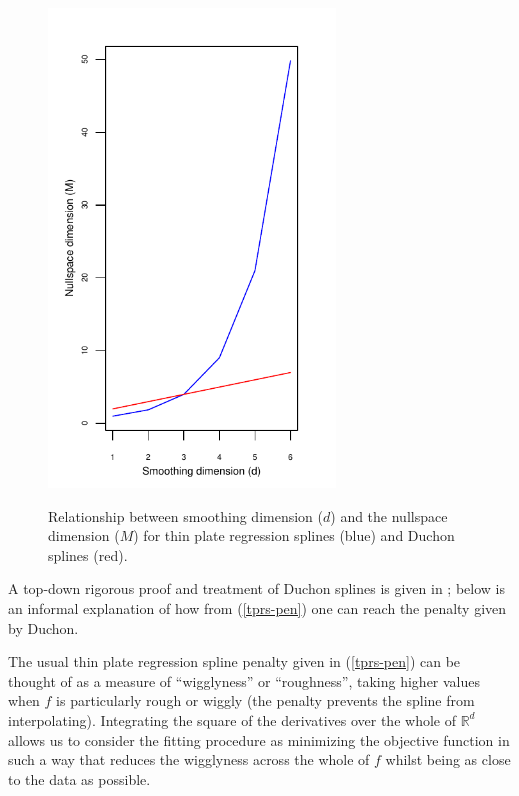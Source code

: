 \begin{figure}
\centering
\includegraphics[width=3in]{gds/figs/nullspace-dim.pdf} \\
\caption{Relationship between smoothing dimension ($d$) and the nullspace dimension ($M$) for thin plate regression splines (blue) and Duchon splines (red).}
\label{nullspace-dim}
\end{figure}

A top-down rigorous proof and treatment of Duchon splines is given in \cite{duchon77}; below is an informal explanation of how from (\ref{tprs-pen}) one can reach the penalty given by Duchon. 

The usual thin plate regression spline penalty given in (\ref{tprs-pen}) can be thought of as a measure of ``wigglyness'' or ``roughness'', taking higher values when $f$ is particularly rough or wiggly (the penalty prevents the spline from interpolating). Integrating the square of the derivatives over the whole of $\mathbb{R}^d$ allows us to consider the fitting procedure as minimizing the objective function in such a way that reduces the wigglyness across the whole of $f$ whilst being as close to the data as possible. 

